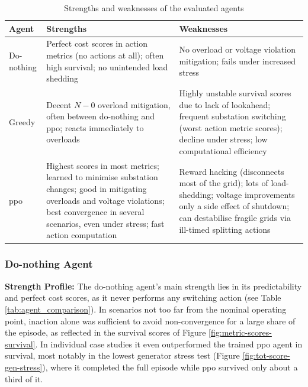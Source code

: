 \begin{table}[htp]
    \centering
    \caption{Strengths and weaknesses of the evaluated agents}
    \label{tab:agent-profiles}
    \begin{tabularx}{\textwidth}{l X X}
        \toprule
        \textbf{Agent} & \textbf{Strengths} & \textbf{Weaknesses} \\
        \midrule
        Do-nothing &
        Perfect cost scores in action metrics (no actions at all); often high survival; no unintended load shedding &
        No overload or voltage violation mitigation; fails under increased stress \\
        \addlinespace
        Greedy &
        Decent $N-0$ overload mitigation, often between do-nothing and \ac{ppo}; reacts immediately to overloads &
        Highly unstable survival scores due to lack of lookahead; frequent substation switching (worst action metric scores); decline under stress; low computational efficiency \\
        \addlinespace
        \ac{ppo} &
        Highest scores in most metrics; learned to minimise substation changes; good in mitigating overloads and voltage violations; best convergence in several scenarios, even under stress; fast action computation &
        Reward hacking (disconnects most of the grid); lots of load-shedding; voltage improvements only a side effect of shutdown; can destabilise fragile grids via ill-timed splitting actions \\
        \bottomrule
    \end{tabularx}
\end{table}

\subsubsection{Do-nothing Agent}
\textbf{Strength Profile:} The do-nothing agent's main strength lies in its predictability and perfect cost scores, as it never performs any switching action (see Table \ref{tab:agent_comparison}). In scenarios not too far from the nominal operating point, inaction alone was sufficient to avoid non-convergence for a large share of the episode, as reflected in the survival scores of Figure \ref{fig:metric-scores-survival}. In individual case studies it even outperformed the trained \ac{ppo} agent in survival, most notably in the lowest generator stress test (Figure \ref{fig:tot-score-gen-stress}), where it completed the full episode while \ac{ppo} survived only about a third of it.

